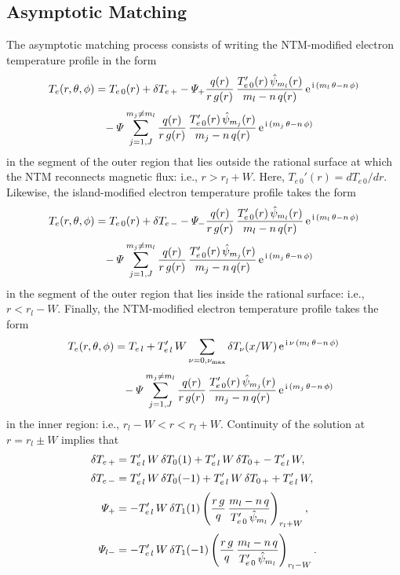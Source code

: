 \documentclass{iopjournal}
\begin{document}
\subsection{Asymptotic Matching}
The asymptotic matching process consists of writing the NTM-modified electron temperature profile in the form
\begin{align}
T_e(r,\theta,\phi)&= T_{e\,0}(r) +\delta T_{e\,+}-{\mit\Psi}_+\frac{q(r)}{r\,g(r)}\,\frac{T_{e\,0}'(r)\,\hat{\psi}_{m_l}(r)}{m_l-n\,q(r)}\,{\rm e}^{\,{\rm i}\,(m_l\,\theta-n\,\phi)}\nonumber\\[0.5ex]&\phantom{=}
-{\mit\Psi}\sum_{j=1,J}^{m_j\neq m_l} \frac{q(r)}{r\,g(r)}\,\frac{T_{e\,0}'(r)\,\hat{\psi}_{m_j}(r)}{m_j-n\,q(r)}\,{\rm e}^{\,{\rm i}\,(m_j\,\theta-n\,\phi)}
\end{align}
in the segment of the outer region that lies outside the rational surface at which the NTM reconnects magnetic flux: i.e., $r>r_l+W$. Here, $T_{e\,0}'(r) = dT_{e\,0}/dr$. Likewise, the
island-modified electron temperature profile takes the form
\begin{align}
T_e(r,\theta,\phi)&= T_{e\,0}(r) +\delta T_{e\,-}-{\mit\Psi}_-\frac{q(r)}{r\,g(r)}\,\frac{T_{e\,0}'(r)\,\hat{\psi}_{m_l}(r)}{m_l-n\,q(r)}\,{\rm e}^{\,{\rm i}\,(m_l\,\theta-n\,\phi)}\nonumber\\[0.5ex]&\phantom{=}
-{\mit\Psi}\sum_{j=1,J}^{m_j\neq m_l} \frac{q(r)}{r\,g(r)}\,\frac{T_{e\,0}'(r)\,\hat{\psi}_{m_j}(r)}{m_j-n\,q(r)}\,{\rm e}^{\,{\rm i}\,(m_j\,\theta-n\,\phi)}
\end{align}
in the segment of the outer region that lies inside the rational surface: i.e., $r<r_l-W$. Finally, the NTM-modified electron temperature profile 
takes the form
\begin{align}
T_e(r,\theta,\phi) &= T_{e\,l} + T_{e\,l}'\,W\sum_{\nu=0,\nu_{\rm max}}\delta T_\nu(x/W)\,{\rm e}^{\,{\rm i}\,\nu\,(m_l\,\theta-n\,\phi)}\nonumber\\[0.5ex]
&\phantom{=}
-{\mit\Psi}\sum_{j=1,J}^{m_j\neq m_l} \frac{q(r)}{r\,g(r)}\,\frac{T_{e\,0}'(r)\,\hat{\psi}_{m_j}(r)}{m_j-n\,q(r)}\,{\rm e}^{\,{\rm i}\,(m_j\,\theta-n\,\phi)}
\end{align}
in the inner region: i.e., $r_l-W<r<r_l+W$.  Continuity of the solution at $r=r_l\pm W$ implies that
\begin{align}
\delta T_{e\,+} &= T_{e\,l}'\,W\,\delta T_{0}(1)+T_{e\,l}'\,W\,\delta T_{0\,+} - T_{e\,l}'\,W,\\[0.5ex]
\delta T_{e\,-} &= T_{e\,l}'\,W\,\delta T_{0}(-1) +T_{e\,l}'\,W\,\delta T_{0\,+}+ T_{e\,l}'\,W,\\[0.5ex]
{\mit\Psi}_{+} &= - T_{e\,l}'\,W\,\delta T_1(1)\left(\frac{r\,g}{q}\,\frac{m_l-n\,q}{T_{e\,0}'\,\hat{\psi}_{m_l}}\right)_{r_l+W},\\[0.5ex]
{\mit\Psi}_{l-} &=- T_{e\,l}'\,W\,\delta T_1(-1)\left(\frac{r\,g}{q}\,\frac{m_l-n\,q}{T_{e\,0}'\,\hat{\psi}_{m_l}}
\right)_{r_l-W}.
\end{align}
\end{document}
